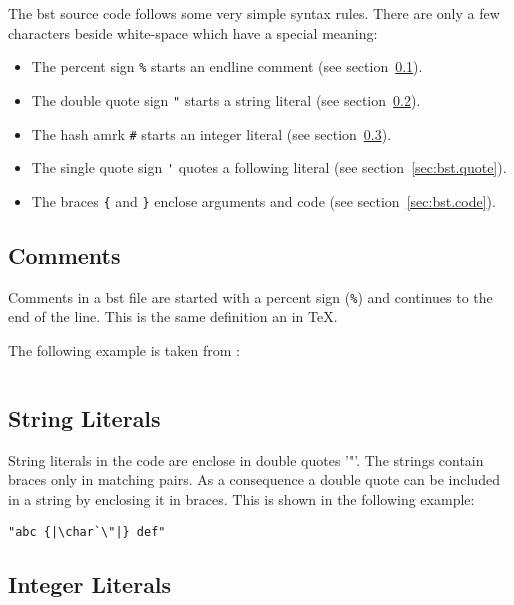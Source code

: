 The bst source code follows some very simple syntax rules. There are
only a few characters beside white-space which have a special meaning:

\begin{itemize}
\item The percent sign \verb|%| starts an endline comment (see
  section~\ref{sec:bst.comments}).
\item The double quote sign \verb|"| starts a string literal (see
  section~\ref{sec:bst.strings}).
\item The hash amrk \verb|#| starts an integer literal (see
  section~\ref{sec:bst.integers}).
\item The single quote sign \verb|'| quotes a following literal (see
  section~\ref{sec:bst.quote}).
\item The braces \verb|{| and \verb|}| enclose arguments and code (see
  section~\ref{sec:bst.code}).
\end{itemize}


\subsection{Comments}\label{sec:bst.comments}

Comments in a bst file are started with a percent sign (\verb|%|) and
continues to the end of the line. This is the same definition an in
\TeX{}.

The following example is taken from :

\begin{lstlisting}[language=bst]
  % BibTeX standard bibliography style `alpha'
\end{lstlisting}


\subsection{String Literals}\label{sec:bst.strings}

String literals in the code are enclose in double quotes '"'. The
strings contain braces only in matching pairs. As a consequence a
double quote can be included in a string by enclosing it in braces.
This is shown in the following example:

\begin{lstlisting}[language=bst,escapechar=|]
  "abc {|\char`\"|} def"
\end{lstlisting}


\subsection{Integer Literals}\label{sec:bst.integers}

